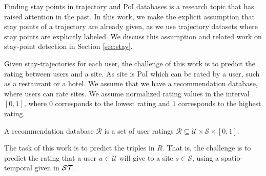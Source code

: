 Finding stay points in trajectory and PoI databases is a research topic that has raised attention in the past. In this work, we make the explicit assumption that stay points of a trajectory are already given, as we use trajectory datasets where stay points are explicitly labeled. We discuss this assumption and related work on stay-point detection in Section \ref{sec:stay}.

Given stay-trajectories for each user, the challenge of this work is to predict the rating between users and a site. As site is PoI which can be rated by a user, such as a restaurant or a hotel. We assume that we have a recommendation database, where users can rate sites. We assume normalized rating values in the interval $[0,1]$, where $0$ corresponds to the lowest rating and $1$ corresponds to the highest rating.
\begin{definition}
A recommendation database $\mathcal{R}$ is a set of user ratings $\mathcal{R}\subseteq \mathcal{U}\times\mathcal{S}\times [0,1]$.
\end{definition}
The task of this work is to predict the triples in $R$. That is, the challenge is to predict the rating that a user $u\in \mathcal{U}$ will give to a site $s\in\mathcal{S}$, using a spatio-temporal given in $\mathcal{ST}$.

